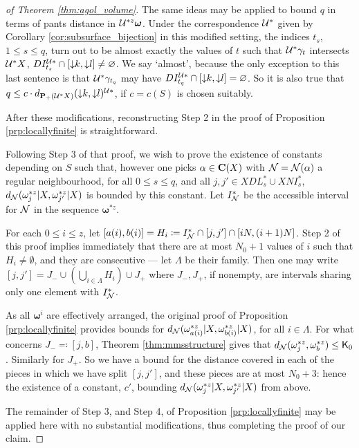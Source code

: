 \begin{proof}[of Theorem \ref{thm:agol_volume}]
The same ideas may be applied to bound $q$ in terms of pants distance in ${\mathcal U}^{*z}\bm\omega$. Under the correspondence ${\mathcal U}^*$ given by Corollary \ref{cor:subsurface_bijection} in this modified setting, the indices $t_s$, $1 \leq s \leq q$, turn out to be almost exactly the values of $t$ such that ${\mathcal U}^*\gamma_t$ intersects ${\mathcal U}^* X$, $DI^{{\mathcal U}*}_{t_s}\cap [\mathord{\downarrow} k,\mathord{\downarrow} l] \not=\varnothing$. We say `almost', because the only exception to this last sentence is that ${\mathcal U}^*\gamma_{t_q}$ may have $DI^{{\mathcal U}*}_{t_q}\cap [\mathord{\downarrow} k,\mathord{\downarrow} l] =\varnothing$. So it is also true that $q\leq c \cdot d_{{\mathbf{P}_+}({\mathcal U}^* X)}(\mathord{\downarrow} k,\mathord{\downarrow} l)^{{\mathcal U}*}$, if $c=c(S)$ is chosen suitably.

After these modifications, reconstructing Step 2 in the proof of Proposition \ref{prp:locallyfinite} is straightforward.

Following Step 3 of that proof, we wish to prove the existence of constants depending on $S$ such that, however one picks $\alpha\in\mathbf C(X)$ with ${\mathcal N}={\mathcal N}(\alpha)$ a regular neighbourhood, for all $0\leq s\leq q$, and all $j,j'\in XDL^*_s\cup XNI^*_s$, $d_{\mathcal N}(\omega^{*z}_j|X,\omega^{*z}_{j'}|X)$ is bounded by this constant. Let $I^*_{\mathcal N}$ be the accessible interval for ${\mathcal N}$ in the sequence $\bm\omega^{*z}$.

For each $0\leq i\leq z$, let $[a(i),b(i)]=H_i\coloneqq I^*_{\mathcal N}\cap [j,j']\cap [iN, (i+1)N]$. Step 2 of this proof implies immediately that there are at most $N_0+1$ values of $i$ such that $H_i\not=\emptyset$, and they are consecutive --- let $\Lambda$ be their family. Then one may write $[j,j']=J_-\cup \left(\bigcup_{i\in\Lambda}H_i\right)\cup J_+$ where $J_-, J_+$, if nonempty, are intervals sharing only one element with $I^*_{\mathcal N}$.

As all $\bm\omega^i$ are effectively arranged, the original proof of Proposition \ref{prp:locallyfinite} provides bounds for $d_{\mathcal N}(\omega^{*z}_{a(i)}|X,\omega^{*z}_{b(i)}|X)$, for all $i\in \Lambda$. For what concerns $J_-\eqqcolon[j,b]$, Theorem \ref{thm:mmsstructure} gives that $d_{\mathcal N}(\omega^{*z}_{j},\omega^{*z}_{b})\leq \mathsf{K}_0$. Similarly for $J_+$. So we have a bound for the distance covered in each of the pieces in which we have split $[j,j']$, and these pieces are at most $N_0+3$: hence the existence of a constant, $c'$, bounding $d_{\mathcal N}(\omega^{*z}_j|X,\omega^{*z}_{j'}|X)$ from above.

The remainder of Step 3, and Step 4, of Proposition \ref{prp:locallyfinite} may be applied here with no substantial modifications, thus completing the proof of our claim.


\end{proof}
